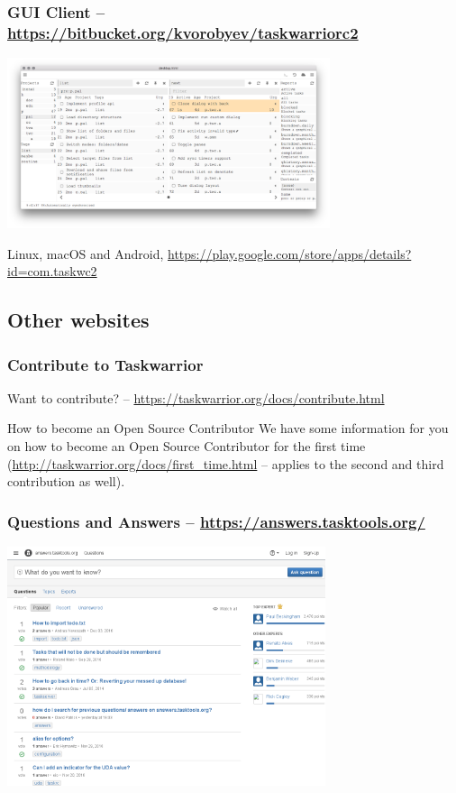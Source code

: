 \documentclass[t,handout,aspectratio=169]{beamer}
\begin{document}
\begin{frame}[fragile]\frametitle{GUI Client -- \url{https://bitbucket.org/kvorobyev/taskwarriorc2}}
    \vfill
    \begin{center}
        \href{https://bitbucket.org/kvorobyev/taskwarriorc2}{\includegraphics[height=5cm]{taskwarriorc2.png}}
    \end{center}
    Linux, macOS and Android,
    \url{https://play.google.com/store/apps/details?id=com.taskwc2}
\end{frame}

\subsection{Other websites}

\begin{frame}[fragile]\frametitle{Contribute to Taskwarrior}
    \vfill
    Want to contribute? -- \url{https://taskwarrior.org/docs/contribute.html}
    \vfill
	\begin{alertblock}{How to become an Open Source Contributor}
		We have some information for you on how to become an Open Source Contributor for the first time (\url{http://taskwarrior.org/docs/first_time.html} -- applies to the second and third contribution as well).
	\end{alertblock}
\end{frame}

\begin{frame}[fragile]\frametitle{Questions and Answers -- \url{https://answers.tasktools.org/}}
    \begin{center}
        \href{http://answers.tasktools.org/}{\includegraphics[height=7cm]{answers-tasktools-org.png}}
    \end{center}
\end{frame}
\end{document}
